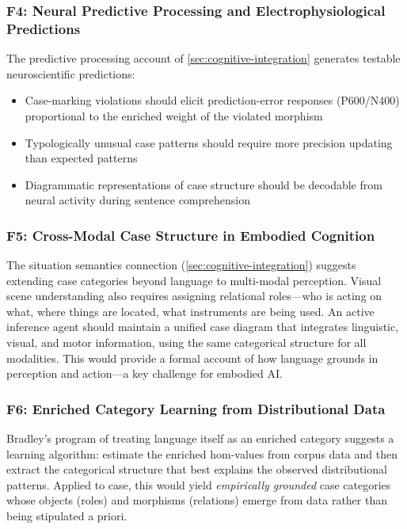 \documentclass[
]{article}
\providecommand{\tightlist}{%
  \setlength{\itemsep}{0pt}\setlength{\parskip}{0pt}}
\begin{document}
\subsubsection{F4: Neural Predictive Processing and Electrophysiological
Predictions}\label{f4-neural-predictive-processing-and-electrophysiological-predictions}

The predictive processing account of \autoref{sec:cognitive-integration}
generates testable neuroscientific predictions:

\begin{itemize}
\tightlist
\item
  Case-marking violations should elicit prediction-error responses
  (P600/N400) proportional to the enriched weight of the violated
  morphism
\item
  Typologically unusual case patterns should require more precision
  updating than expected patterns
\item
  Diagrammatic representations of case structure should be decodable
  from neural activity during sentence comprehension
\end{itemize}

\subsubsection{F5: Cross-Modal Case Structure in Embodied
Cognition}\label{f5-cross-modal-case-structure-in-embodied-cognition}

The situation semantics connection (\autoref{sec:cognitive-integration})
suggests extending case categories beyond language to multi-modal
perception. Visual scene understanding also requires assigning
relational roles---who is acting on what, where things are located, what
instruments are being used. An active inference agent should maintain a
unified case diagram that integrates linguistic, visual, and motor
information, using the same categorical structure for all modalities.
This would provide a formal account of how language grounds in
perception and action---a key challenge for embodied AI.

\subsubsection{F6: Enriched Category Learning from Distributional
Data}\label{f6-enriched-category-learning-from-distributional-data}

Bradley's
\citetext{\citeyear{bradley2024ipam}; \citeyear{bradley2025tea}} program
of treating language itself as an enriched category suggests a learning
algorithm: estimate the enriched hom-values from corpus data and then
extract the categorical structure that best explains the observed
distributional patterns. Applied to case, this would yield
\emph{empirically grounded} case categories whose objects (roles) and
morphisms (relations) emerge from data rather than being stipulated a
priori.
\end{document}
